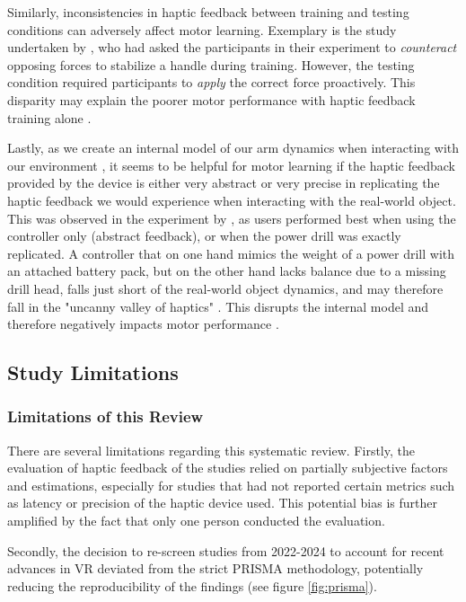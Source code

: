 Similarly, inconsistencies in haptic feedback between training and testing conditions can adversely affect motor learning. Exemplary is the study undertaken by \cite{Morris2007}, who had asked the participants in their experiment to \textit{counteract} opposing forces to stabilize a handle during training. However, the testing condition required participants to \textit{apply} the correct force proactively. This disparity may explain the poorer motor performance with haptic feedback training alone \cite{Morris2007}.

Lastly, as we create an internal model of our arm dynamics when interacting with our environment \cite{Pierella2019TheModels}, it seems to be helpful for motor learning if the haptic feedback provided by the device is either very abstract or very precise in replicating the haptic feedback we would experience when interacting with the real-world object. This was observed in the experiment by \cite{Yang2023}, as users performed best when using the controller only (abstract feedback), or when the power drill was exactly replicated. A controller that on one hand mimics the weight of a power drill with an attached battery pack, but on the other hand lacks balance due to a missing drill head, falls just short of the real-world object dynamics, and may therefore fall in the "uncanny valley of haptics" \cite{Berger2018TheHaptics}. This disrupts the internal model and therefore negatively impacts motor performance \cite{Yang2023}. 


\subsection{Study Limitations}

\subsubsection{Limitations of this Review}
There are several limitations regarding this systematic review.
Firstly, the evaluation of haptic feedback of the studies relied on partially subjective factors and estimations, especially for studies that had not reported certain metrics such as latency or precision of the haptic device used. This potential bias is further amplified by the fact that only one person conducted the evaluation.

Secondly, the decision to re-screen studies from 2022-2024 to account for recent advances in VR deviated from the strict PRISMA methodology, potentially reducing the reproducibility of the findings (see figure \ref{fig:prisma}).


